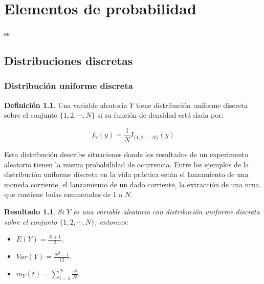 \documentclass[
  spanish,
]{book}
\providecommand{\tightlist}{%
  \setlength{\itemsep}{0pt}\setlength{\parskip}{0pt}}
\newtheorem{proposition}{Resultado}[chapter]
\theoremstyle{definition}
\newtheorem{definition}{Definición}[chapter]
\theoremstyle{definition}
\theoremstyle{definition}
\theoremstyle{definition}
\theoremstyle{remark}
\begin{document}
\hypertarget{appendix-apuxe9ndice}{%
\appendix}


\hypertarget{elementos-de-probabilidad}{%
\chapter{Elementos de probabilidad}\label{elementos-de-probabilidad}}

ss

\hypertarget{distribuciones-discretas}{%
\section{Distribuciones discretas}\label{distribuciones-discretas}}

\hypertarget{distribuciuxf3n-uniforme-discreta}{%
\subsection{Distribución uniforme discreta}\label{distribuciuxf3n-uniforme-discreta}}

\begin{definition}
\protect\hypertarget{def:unnamed-chunk-1}{}{\label{def:unnamed-chunk-1} }Una variable aleatoria \(Y\) tiene distribución uniforme discreta sobre el conjunto \(\{1,2,\cdots,N\}\) si su función de densidad está dada por:

\begin{equation}
f_Y(y)=\frac{1}{N}I_{\{1,2,\cdots,N\}}(y)
\end{equation}
\end{definition}

Esta distribución describe situaciones donde los resultados de un experimento aleatorio tienen la misma probabilidad de ocurrencia. Entre los ejemplos de la distribución uniforme discreta en la vida práctica están el lanzamiento de una moneda corriente, el lanzamiento de un dado corriente, la extracción de una urna que contiene bolas enumeradas de 1 a \(N\).

\begin{proposition}
\protect\hypertarget{prp:unnamed-chunk-2}{}{\label{prp:unnamed-chunk-2} }Si \(Y\) es una variable aleatoria con distribución uniforme discreta sobre el conjunto \(\{1,2,\cdots,N\}\), entonces:

\begin{itemize}
\tightlist
\item
  \(E(Y)=\frac{N+1}{2}\).
\item
  \(Var(Y)=\frac{N^2-1}{12}\).
\item
  \(m_Y(t)=\sum_{i=1}^N\frac{e^{ti}}{N}\).
\end{itemize}
\end{proposition}
\end{document}
